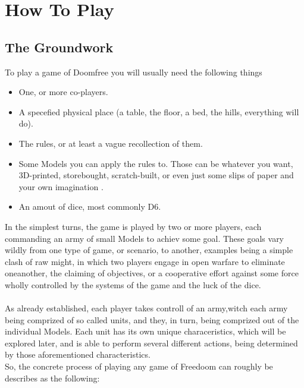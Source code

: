\documentclass[a4paper,14pt]{book}
\begin{document}
\chapter{How To Play}

\section {The Groundwork}
To play a game of Doomfree you will usually need the following things

\begin{adjustwidth}{-3cm}{-3cm}
\begin{multicols}{3}
\begin{itemize}

	\item One, or more co-players.
	\item A specefied physical place (a table, the floor, a bed, the hills, everything will do).
	\item The rules, or at least a vague recollection of them.
	\item Some Models you can apply the rules to. Those can be whatever you want, 3D-printed, storebought, scratch-built, or even just some slips of paper and your own imagination .
	\item An amout of dice, most commonly D6.
	
\end{itemize}
\end{multicols}
\end{adjustwidth}


In the simplest turns, the game is played by two or more  players, each commanding an army of small Models to achiev some goal. These goals vary wildly from one type of game, or scenario, to another, examples being a simple clash of raw might, in which two players engage in open warfare to eliminate oneanother, the claiming of objectives, or a cooperative effort against some force wholly controlled by the systems of the game and the luck of the dice.\\
\\

As already established, each player takes controll of an army,witch each army being comprized of so called units, and they, in turn, being comprized out of the individual Models. Each unit has its own unique characeristics, which will be explored later, and is able to perform several different actions,  being determined by those aforementioned characteristics.\\
\newpage
So, the concrete process of playing any game of Freedoom can roughly be describes as the following:\\
\end{document}
